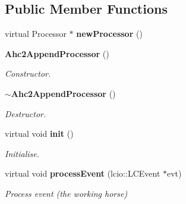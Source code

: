 \subsection*{Public Member Functions}
\begin{DoxyCompactItemize}
\item 
virtual Processor $\ast$ {\bfseries new\-Processor} ()\label{classCALICE_1_1Ahc2AppendProcessor_a5008f6b9bfc17a27630f14764a2746d2}

\item 
{\bf Ahc2\-Append\-Processor} ()\label{classCALICE_1_1Ahc2AppendProcessor_ae2d1110a71e12f08ba04ddd44db765de}

\begin{DoxyCompactList}\small\item\em Constructor. \end{DoxyCompactList}\item 
{\bf $\sim$\-Ahc2\-Append\-Processor} ()\label{classCALICE_1_1Ahc2AppendProcessor_ae2e9652363dfc5fcf5c95e34e731e7b5}

\begin{DoxyCompactList}\small\item\em Destructor. \end{DoxyCompactList}\item 
virtual void {\bf init} ()\label{classCALICE_1_1Ahc2AppendProcessor_a1bd0b7774d169ebcc9f5387df38d09c2}

\begin{DoxyCompactList}\small\item\em Initialise. \end{DoxyCompactList}\item 
virtual void {\bf process\-Event} (lcio\-::\-L\-C\-Event $\ast$evt)\label{classCALICE_1_1Ahc2AppendProcessor_ac818e075407b86aff4d03fb9a4edfe6e}

\begin{DoxyCompactList}\small\item\em Process event (the working horse) \end{DoxyCompactList}\end{DoxyCompactItemize}
